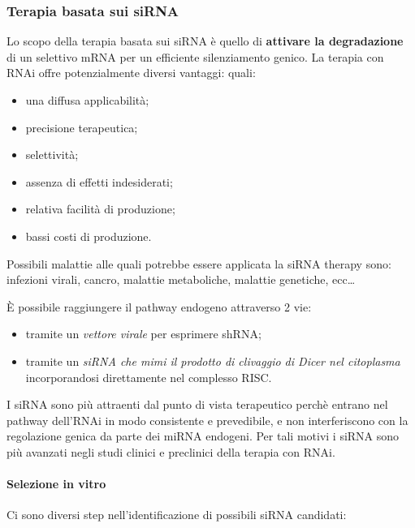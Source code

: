 \documentclass[]{article}
\begin{document}
\subsubsection{Terapia basata sui siRNA}\label{terapia-basata-sui-sirna}

Lo scopo della terapia basata sui siRNA è quello di \textbf{attivare la
degradazione} di un selettivo mRNA per un efficiente silenziamento
genico. La terapia con RNAi offre potenzialmente diversi vantaggi:
quali:

\begin{itemize}
\itemsep1pt\parskip0pt
\item
  una diffusa applicabilità;
\item
  precisione terapeutica;
\item
  selettività;
\item
  assenza di effetti indesiderati;
\item
  relativa facilità di produzione;
\item
  bassi costi di produzione.
\end{itemize}

Possibili malattie alle quali potrebbe essere applicata la siRNA therapy
sono: infezioni virali, cancro, malattie metaboliche, malattie
genetiche, ecc\ldots{}

È possibile raggiungere il pathway endogeno attraverso 2 vie:

\begin{itemize}
\itemsep1pt\parskip0pt
\item
  tramite un \emph{vettore virale} per esprimere shRNA;
\item
  tramite un \emph{siRNA che mimi il prodotto di clivaggio di Dicer nel
  citoplasma} incorporandosi direttamente nel complesso RISC.
\end{itemize}

I siRNA sono più attraenti dal punto di vista terapeutico perchè entrano
nel pathway dell'RNAi in modo consistente e prevedibile, e non
interferiscono con la regolazione genica da parte dei miRNA endogeni.
Per tali motivi i siRNA sono più avanzati negli studi clinici e
preclinici della terapia con RNAi.

\paragraph{Selezione in vitro}\label{selezione-in-vitro}

Ci sono diversi step nell'identificazione di possibili siRNA candidati:
\end{document}

